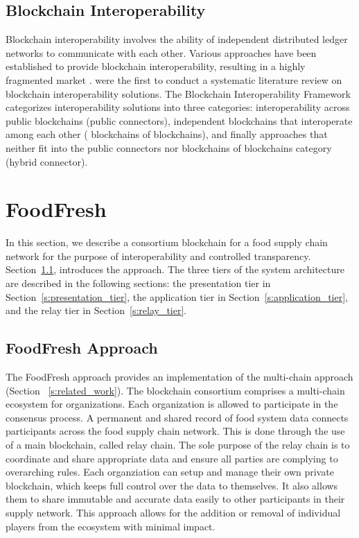 \documentclass[conference]{IEEEtran}
\begin{document}
\subsection{Blockchain Interoperability} \label{s:blockchain_interoperability}
Blockchain interoperability involves the ability of independent distributed ledger networks to communicate with each other. Various approaches have been established to provide blockchain interoperability, resulting in a highly fragmented market \cite{belchior2021survey}.   were the first to conduct a systematic literature review on blockchain interoperability solutions. The Blockchain Interoperability Framework \citeauthor{belchior2021survey} categorizes interoperability solutions into three categories: interoperability across public blockchains (public connectors),  independent blockchains that interoperate among each other ( blockchains of blockchains), and finally approaches that neither fit into the public connectors nor blockchains of blockchains category (hybrid connector). 

\section{FoodFresh} \label{s:chainFresh}
In this section, we describe a consortium blockchain for a food supply chain network for the purpose of interoperability and controlled transparency. Section~\ref{s:chainfresh_approach}, introduces the approach. The three tiers of the system architecture are described in the following sections: the presentation tier in Section~\ref{s:presentation_tier},  the application tier in Section~\ref{s:application_tier}, and the relay tier in Section~\ref{s:relay_tier}.

\subsection{FoodFresh Approach} \label{s:chainfresh_approach}
The FoodFresh approach provides an implementation of the multi-chain approach (Section~ \ref{s:related_work}). The blockchain consortium comprises a multi-chain ecosystem for organizations. Each organization is allowed to participate in the consensus process. 
A permanent and shared record of food system data connects participants across the food supply chain network. This is done through the use of a main blockchain, called relay chain. The sole purpose of the relay chain is to coordinate and share appropriate data and ensure all parties are complying to overarching rules. Each organziation can setup and manage their own private blockchain, which keeps full control over the data to themselves. It also allows them to share immutable and accurate data easily to other participants in their supply network. This approach allows for the addition or removal of individual players from the ecosystem with minimal impact.
\end{document}
